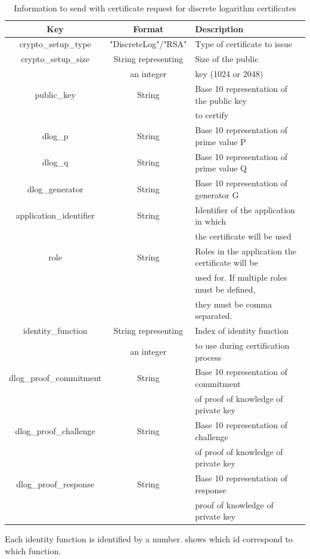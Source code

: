 \documentclass[oneside]{scrreprt}
\begin{document}
\begin{table}[ht]
\centering
\begin{tabular}{|c|c|l|}
  \hline
  Key & Format & Description\\
  \hline
  crypto\_setup\_type & "DiscreteLog"/"RSA" & Type of certificate to issue\\
  crypto\_setup\_size & String representing & Size of the public\\ & an integer & key (1024 or 2048)\\
  public\_key & String & Base 10 representation of the public key\\ & & to certify\\
  dlog\_p & String & Base 10 representation of prime value P\\
  dlog\_q & String & Base 10 representation of prime value Q\\
  dlog\_generator & String & Base 10 representation of generator G\\      
  application\_identifier & String & Identifier of the application in which\\ & & the certificate will be used\\
  role & String & Roles in the application the certificate will be\\ & & used for. If multiple roles must be defined, \\ & & they must be comma separated.\\
  identity\_function & String representing & Index of identity function\\ & an integer & to use during certification process\\
  dlog\_proof\_commitment & String & Base 10 representation of commitment \\ & & of proof of knowledge of private key\\
  dlog\_proof\_challenge & String & Base 10 representation of challenge \\ & & of proof of knowledge of private key\\
  dlog\_proof\_response & String & Base 10 representation of response \\ & & proof of knowledge of private key\\
  \hline
\end{tabular}
\caption{Information to send with certificate request for discrete logarithm certificates}
\label{t:dlog}
\end{table}

Each identity function is identified by a number.  shows which id correspond to which function.
\end{document}
